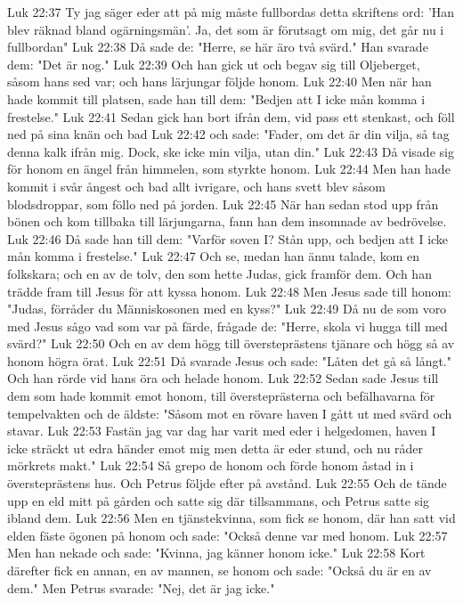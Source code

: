 Luk 22:37  Ty jag säger eder att på mig måste fullbordas detta skriftens ord: 'Han blev räknad bland ogärningsmän'. Ja, det som är förutsagt om mig, det går nu i fullbordan"
Luk 22:38  Då sade de: "Herre, se här äro två svärd." Han svarade dem: "Det är nog."
Luk 22:39  Och han gick ut och begav sig till Oljeberget, såsom hans sed var; och hans lärjungar följde honom.
Luk 22:40  Men när han hade kommit till platsen, sade han till dem: "Bedjen att I icke mån komma i frestelse."
Luk 22:41  Sedan gick han bort ifrån dem, vid pass ett stenkast, och föll ned på sina knän och bad
Luk 22:42  och sade: "Fader, om det är din vilja, så tag denna kalk ifrån mig. Dock, ske icke min vilja, utan din."
Luk 22:43  Då visade sig för honom en ängel från himmelen, som styrkte honom.
Luk 22:44  Men han hade kommit i svår ångest och bad allt ivrigare, och hans svett blev såsom blodsdroppar, som föllo ned på jorden.
Luk 22:45  När han sedan stod upp från bönen och kom tillbaka till lärjungarna, fann han dem insomnade av bedrövelse.
Luk 22:46  Då sade han till dem: "Varför soven I? Stån upp, och bedjen att I icke mån komma i frestelse."
Luk 22:47  Och se, medan han ännu talade, kom en folkskara; och en av de tolv, den som hette Judas, gick framför dem. Och han trädde fram till Jesus för att kyssa honom.
Luk 22:48  Men Jesus sade till honom: "Judas, förråder du Människosonen med en kyss?"
Luk 22:49  Då nu de som voro med Jesus sågo vad som var på färde, frågade de: "Herre, skola vi hugga till med svärd?"
Luk 22:50  Och en av dem högg till översteprästens tjänare och högg så av honom högra örat.
Luk 22:51  Då svarade Jesus och sade: "Låten det gå så långt." Och han rörde vid hans öra och helade honom.
Luk 22:52  Sedan sade Jesus till dem som hade kommit emot honom, till översteprästerna och befälhavarna för tempelvakten och de äldste: "Såsom mot en rövare haven I gått ut med svärd och stavar.
Luk 22:53  Fastän jag var dag har varit med eder i helgedomen, haven I icke sträckt ut edra händer emot mig men detta är eder stund, och nu råder mörkrets makt."
Luk 22:54  Så grepo de honom och förde honom åstad in i översteprästens hus. Och Petrus följde efter på avstånd.
Luk 22:55  Och de tände upp en eld mitt på gården och satte sig där tillsammans, och Petrus satte sig ibland dem.
Luk 22:56  Men en tjänstekvinna, som fick se honom, där han satt vid elden fäste ögonen på honom och sade: "Också denne var med honom.
Luk 22:57  Men han nekade och sade: "Kvinna, jag känner honom icke."
Luk 22:58  Kort därefter fick en annan, en av mannen, se honom och sade: "Också du är en av dem." Men Petrus svarade: "Nej, det är jag icke."
